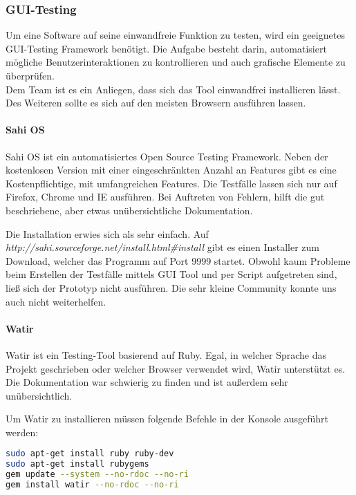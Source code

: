 \subsubsection{GUI-Testing}
Um eine Software auf seine einwandfreie Funktion zu testen, wird ein geeignetes GUI-Testing Framework benötigt. Die Aufgabe besteht darin, automatisiert mögliche Benutzerinteraktionen zu kontrollieren und auch grafische Elemente zu überprüfen.\\
Dem Team ist es ein Anliegen, dass sich das Tool einwandfrei installieren lässt. Des Weiteren sollte es sich auf den meisten Browsern ausführen lassen.

\paragraph{Sahi OS}
Sahi OS ist ein automatisiertes Open Source Testing Framework. Neben der kostenlosen Version mit einer eingeschränkten Anzahl an Features gibt es eine Kostenpflichtige, mit umfangreichen Features. Die Testfälle lassen sich nur auf Firefox, Chrome und IE ausführen. Bei Auftreten von Fehlern, hilft die gut beschriebene, aber etwas unübersichtliche Dokumentation.

Die Installation erwies sich als sehr einfach. Auf \textit{http://sahi.sourceforge.net/install.html\#install} gibt es einen Installer zum Download, welcher das Programm auf Port 9999 startet. Obwohl kaum Probleme beim Erstellen der Testfälle mittels GUI Tool und per Script aufgetreten sind, ließ sich der Prototyp nicht ausführen. Die sehr kleine Community konnte uns auch nicht weiterhelfen.

\paragraph{Watir}
Watir ist ein Testing-Tool basierend auf Ruby. Egal, in welcher Sprache das Projekt geschrieben oder welcher Browser verwendet wird, Watir unterstützt es.\\
Die Dokumentation war schwierig zu finden und ist außerdem sehr unübersichtlich. \cite{WATIR}

Um Watir zu installieren müssen folgende Befehle in der Konsole ausgeführt werden: 
\begin{lstlisting}[caption={Installation von Watir \cite{WATIRINSTALL}}, language=bash]
sudo apt-get install ruby ruby-dev
sudo apt-get install rubygems
gem update --system --no-rdoc --no-ri
gem install watir --no-rdoc --no-ri
\end{lstlisting}


